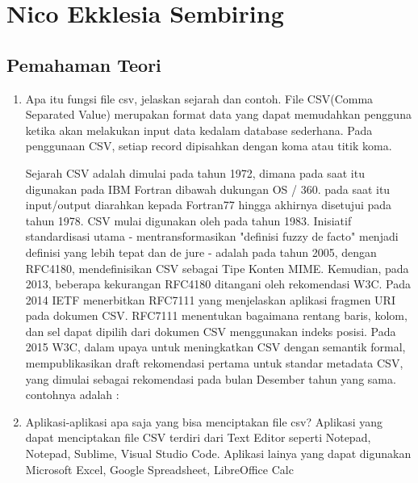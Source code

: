 \section{Nico Ekklesia Sembiring}
\subsection{Pemahaman Teori}
\begin{enumerate}
	\item Apa itu fungsi file csv, jelaskan sejarah dan contoh.
	File CSV(Comma Separated Value) merupakan format data yang dapat memudahkan pengguna ketika akan melakukan input data kedalam database sederhana. Pada penggunaan CSV, setiap record dipisahkan dengan koma atau titik koma.

	Sejarah CSV adalah  dimulai pada tahun 1972, dimana pada saat itu digunakan pada IBM Fortran dibawah dukungan OS / 360. pada saat itu input/output diarahkan kepada Fortran77 hingga akhirnya disetujui pada tahun 1978. CSV mulai digunakan oleh pada tahun 1983. Inisiatif standardisasi utama - mentransformasikan "definisi fuzzy de facto" menjadi definisi yang lebih tepat dan de jure - adalah pada tahun 2005, dengan RFC4180, mendefinisikan CSV sebagai Tipe Konten MIME. Kemudian, pada 2013, beberapa kekurangan RFC4180 ditangani oleh rekomendasi W3C. Pada 2014 IETF menerbitkan RFC7111 yang menjelaskan aplikasi fragmen URI pada dokumen CSV. RFC7111 menentukan bagaimana rentang baris, kolom, dan sel dapat dipilih dari dokumen CSV menggunakan indeks posisi. Pada 2015 W3C, dalam upaya untuk meningkatkan CSV dengan semantik formal, mempublikasikan draft rekomendasi pertama untuk standar metadata CSV, yang dimulai sebagai rekomendasi pada bulan Desember tahun yang sama.
contohnya adalah :

	
	\item Aplikasi-aplikasi apa saja yang bisa menciptakan file csv?
	Aplikasi yang dapat menciptakan file CSV terdiri dari Text Editor seperti Notepad, Notepad, Sublime, Visual Studio Code. Aplikasi lainya yang dapat digunakan Microsoft Excel, Google Spreadsheet, LibreOffice Calc
	

\end{enumerate}
